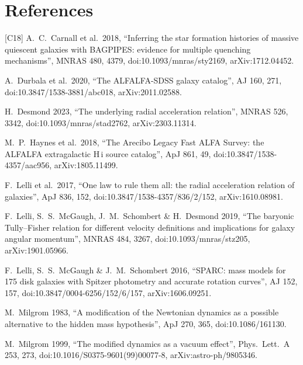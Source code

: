 \documentclass[10pt]{article}
\begin{document}
\section*{References}
\footnotesize
[C18] A.~C.~Carnall et al.\ 2018, ``Inferring the star formation histories of massive quiescent galaxies with BAGPIPES: evidence for multiple quenching mechanisms'', MNRAS 480, 4379, doi:10.1093/mnras/sty2169, arXiv:1712.04452.\par
[D20] A.~Durbala et al.\ 2020, ``The ALFALFA-SDSS galaxy catalog'', AJ 160, 271, doi:10.3847/1538-3881/abc018, arXiv:2011.02588.\par
[D23] H.~Desmond 2023, ``The underlying radial acceleration relation'', MNRAS 526, 3342, doi:10.1093/mnras/stad2762, arXiv:2303.11314.\par
[H18] M.~P.~Haynes et al.\ 2018, ``The Arecibo Legacy Fast ALFA Survey: the ALFALFA extragalactic H\,{\sc i} source catalog'', ApJ 861, 49, doi:10.3847/1538-4357/aac956, arXiv:1805.11499.\par
[L17] F.~Lelli et al.\ 2017, ``One law to rule them all: the radial acceleration relation of galaxies'', ApJ 836, 152, doi:10.3847/1538-4357/836/2/152, arXiv:1610.08981.\par
[L19] F.~Lelli, S.~S.~McGaugh, J.~M.~Schombert \& H.~Desmond 2019, ``The baryonic Tully--Fisher relation for different velocity definitions and implications for galaxy angular momentum'', MNRAS 484, 3267, doi:10.1093/mnras/stz205, arXiv:1901.05966.\par
[LMS16] F.~Lelli, S.~S.~McGaugh \& J.~M.~Schombert 2016, ``SPARC: mass models for 175 disk galaxies with Spitzer photometry and accurate rotation curves'', AJ 152, 157, doi:10.3847/0004-6256/152/6/157, arXiv:1606.09251.\par
[M83] M.~Milgrom 1983, ``A modification of the Newtonian dynamics as a possible alternative to the hidden mass hypothesis'', ApJ 270, 365, doi:10.1086/161130.\par
[M99] M.~Milgrom 1999, ``The modified dynamics as a vacuum effect'', Phys.\ Lett.\ A 253, 273, doi:10.1016/S0375-9601(99)00077-8, arXiv:astro-ph/9805346.\par
\end{document}
